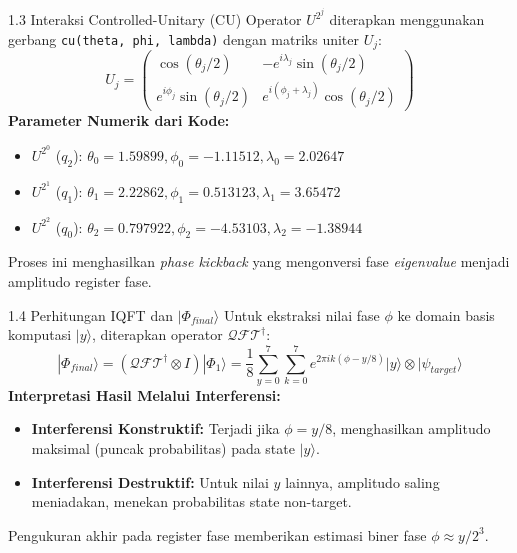 \begin{frame}{1.3 Interaksi Controlled-Unitary (CU)}
    Operator $U^{2^j}$ diterapkan menggunakan gerbang \texttt{cu(theta, phi, lambda)} dengan matriks uniter $U_j$:
    \begin{equation}
        U_j = \begin{pmatrix} \cos(\theta_j/2) & -e^{i\lambda_j}\sin(\theta_j/2) \\ e^{i\phi_j}\sin(\theta_j/2) & e^{i(\phi_j+\lambda_j)}\cos(\theta_j/2) \end{pmatrix}
    \end{equation}
    \textbf{Parameter Numerik dari Kode:}
    \begin{itemize}
        \item $U^{2^0}$ ($q_2$): $\theta_0=1.59899, \phi_0=-1.11512, \lambda_0=2.02647$
        \item $U^{2^1}$ ($q_1$): $\theta_1=2.22862, \phi_1=0.513123, \lambda_1=3.65472$
        \item $U^{2^2}$ ($q_0$): $\theta_2=0.797922, \phi_2=-4.53103, \lambda_2=-1.38944$
    \end{itemize}
    Proses ini menghasilkan \textit{phase kickback} yang mengonversi fase \textit{eigenvalue} menjadi amplitudo register fase.
\end{frame}

\begin{frame}{1.4 Perhitungan IQFT dan $|\Phi_{final}\rangle$}
    Untuk ekstraksi nilai fase $\phi$ ke domain basis komputasi $|y\rangle$, diterapkan operator $\mathcal{QFT}^\dagger$:
    \begin{equation}
        |\Phi_{final}\rangle = \left( \mathcal{QFT}^\dagger \otimes I \right) |\Phi_1\rangle = \frac{1}{8} \sum_{y=0}^{7} \sum_{k=0}^{7} e^{2\pi i k (\phi - y/8)} |y\rangle \otimes |\psi_{target}\rangle
    \end{equation}
    \textbf{Interpretasi Hasil Melalui Interferensi:}
    \begin{itemize}
        \item \textbf{Interferensi Konstruktif:} Terjadi jika $\phi = y/8$, menghasilkan amplitudo maksimal (puncak probabilitas) pada state $|y\rangle$.
        \item \textbf{Interferensi Destruktif:} Untuk nilai $y$ lainnya, amplitudo saling meniadakan, menekan probabilitas state non-target.
    \end{itemize}
    Pengukuran akhir pada register fase memberikan estimasi biner fase $\phi \approx y/2^3$.
\end{frame}
